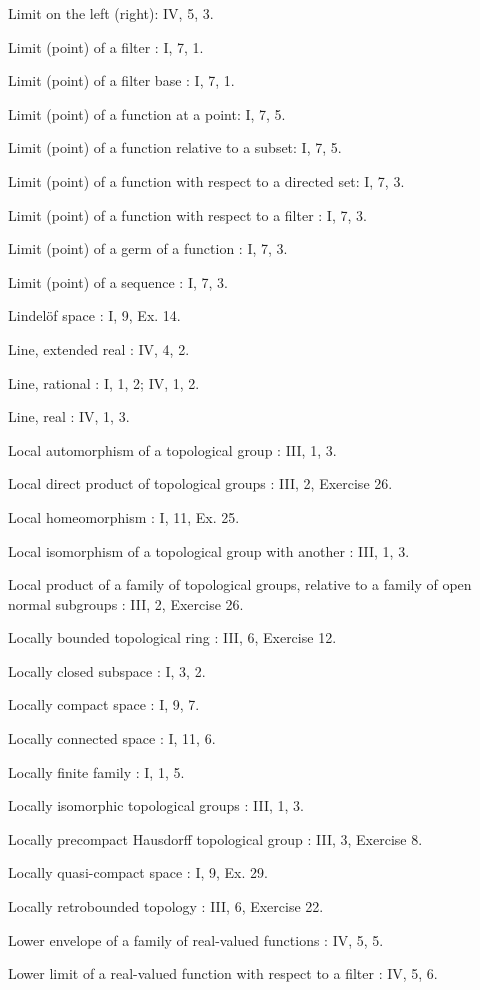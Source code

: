 Limit on the left (right): IV, 5, 3.

Limit (point) of a filter : I, 7, 1.

Limit (point) of a filter base : I, 7, 1.

Limit (point) of a function at a point: I, 7, 5.

Limit (point) of a function relative to a subset: I, 7, 5.

Limit (point) of a function with respect to a directed set: I, 7, 3.

Limit (point) of a function with respect to a filter : I, 7, 3.

Limit (point) of a germ of a function : I, 7, 3.

Limit (point) of a sequence : I, 7, 3.

Lindelöf space : I, 9, Ex. 14.

Line, extended real : IV, 4, 2.

Line, rational : I, 1, 2; IV, 1, 2.

Line, real : IV, 1, 3.

Local automorphism of a topological group : III, 1, 3.

Local direct product of topological groups : III, 2, Exercise 26.

Local homeomorphism : I, 11, Ex. 25.

Local isomorphism of a topological group with another : III, 1, 3.

Local product of a family of topological groups, relative to a family of open normal subgroups : III, 2, Exercise 26.

Locally bounded topological ring : III, 6, Exercise 12.

Locally closed subspace : I, 3, 2.

Locally compact space : I, 9, 7.

Locally connected space : I, 11, 6.

Locally finite family : I, 1, 5.

Locally isomorphic topological groups : III, 1, 3.

Locally precompact Hausdorff topological group : III, 3, Exercise 8.

Locally quasi-compact space : I, 9, Ex. 29.

Locally retrobounded topology : III, 6, Exercise 22.

Lower envelope of a family of real-valued functions : IV, 5, 5.

Lower limit of a real-valued function with respect to a filter : IV, 5, 6.

